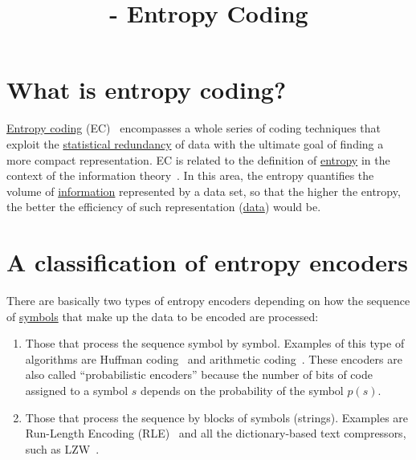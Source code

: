 


\title{\SM{} - Entropy Coding}

\maketitle

\tableofcontents

\section{What is entropy coding?}

\href{https://en.wikipedia.org/wiki/Entropy_coding}{Entropy coding}
(EC)~\cite{vruiz__entropy_coding} encompasses a whole series of coding
techniques that exploit the
\href{https://en.wikipedia.org/wiki/Redundancy_(information_theory)}{statistical
  redundancy} of data with the ultimate goal of finding a more compact
representation. EC is related to the definition of
\href{https://en.wikipedia.org/wiki/Entropy_(information_theory)}{entropy}
in the context of the information
theory~\cite{vruiz__information_theory}. In this area, the entropy
quantifies the volume of
\href{https://en.wikipedia.org/wiki/Information}{information}
represented by a data set, so that the higher the entropy, the better
the efficiency of such representation
(\href{https://en.wikipedia.org/wiki/Data}{data}) would be.

\section{A classification of entropy encoders}

There are basically two types of entropy encoders depending on how the
sequence of \href{https://en.wikipedia.org/wiki/Symbol}{symbols} that
make up the data to be encoded are processed:

\begin{enumerate}
\item Those that process the sequence symbol by symbol. Examples of
  this type of algorithms are Huffman
  coding~\cite{vruiz__huffman_coding} and arithmetic
  coding~\cite{vruiz__arithmetic_coding}. These encoders are also
  called ``probabilistic encoders'' because the number of bits of code
  assigned to a symbol $s$ depends on the probability of the symbol
  $p(s)$.
\item Those that process the sequence by blocks of symbols
  (strings). Examples are Run-Length Encoding (RLE)~\cite{vruiz__rle}
  and all the dictionary-based text compressors, such as
  LZW~\cite{vruiz__LZW}.
\end{enumerate}
  
